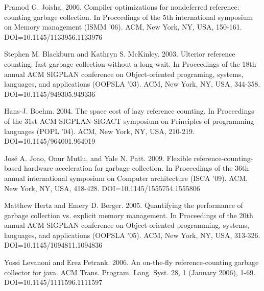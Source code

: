 \documentclass{sigplanconf}
\begin{document}
\begin{thebibliography}{}
\softraggedright
{}
Pramod G. Joisha. 2006. Compiler optimizations for nondeferred reference: counting garbage collection. In Proceedings of the 5th international symposium on Memory management (ISMM '06). ACM, New York, NY, USA, 150-161. DOI=10.1145/1133956.1133976

Stephen M. Blackburn and Kathryn S. McKinley. 2003. Ulterior reference counting: fast garbage collection without a long wait. In Proceedings of the 18th annual ACM SIGPLAN conference on Object-oriented programing, systems, languages, and applications (OOPSLA '03). ACM, New York, NY, USA, 344-358. DOI=10.1145/949305.949336

Hans-J. Boehm. 2004. The space cost of lazy reference counting. In Proceedings of the 31st ACM SIGPLAN-SIGACT symposium on Principles of programming languages (POPL '04). ACM, New York, NY, USA, 210-219. DOI=10.1145/964001.964019 

José A. Joao, Onur Mutlu, and Yale N. Patt. 2009. Flexible reference-counting-based hardware acceleration for garbage collection. In Proceedings of the 36th annual international symposium on Computer architecture (ISCA '09). ACM, New York, NY, USA, 418-428. DOI=10.1145/1555754.1555806

Matthew Hertz and Emery D. Berger. 2005. Quantifying the performance of garbage collection vs. explicit memory management. In Proceedings of the 20th annual ACM SIGPLAN conference on Object-oriented programming, systems, languages, and applications (OOPSLA '05). ACM, New York, NY, USA, 313-326. DOI=10.1145/1094811.1094836  

Yossi Levanoni and Erez Petrank. 2006. An on-the-fly reference-counting garbage collector for java. ACM Trans. Program. Lang. Syst. 28, 1 (January 2006), 1-69. DOI=10.1145/1111596.1111597 

\end{thebibliography}
\end{document}
